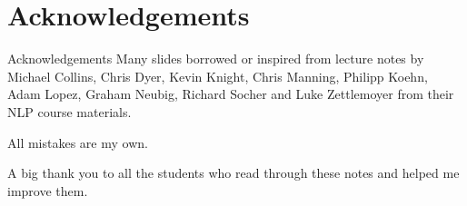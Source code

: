 
\section*{Acknowledgements}

\begin{frame}
\centering
\begin{alertblock}{Acknowledgements}
Many slides borrowed or inspired from lecture notes by Michael Collins, Chris Dyer, Kevin Knight, Chris Manning, Philipp Koehn, Adam Lopez, Graham Neubig, Richard Socher and Luke Zettlemoyer from their NLP course materials. 

\bigskip

All mistakes are my own.

\bigskip

A big thank you to all the students who read through these notes and helped me improve them.

\end{alertblock}
\end{frame}

